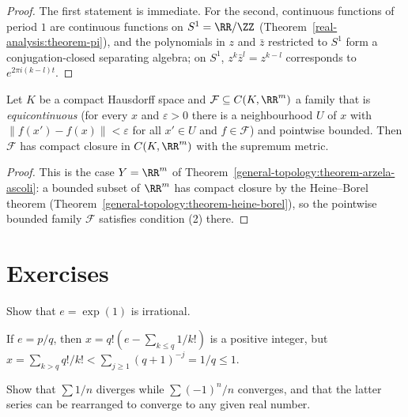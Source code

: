 \begin{proof}
The first statement is immediate. For the second, continuous functions of period $1$ are continuous functions on $S^1 = \RR/\ZZ$ (Theorem~\ref{real-analysis:theorem-pi}), and the polynomials in $z$ and $\bar z$ restricted to
$S^1$ form a conjugation-closed separating algebra; on $S^1$, $z^k\bar z^l = z^{k-l}$ corresponds to $e^{2\pi i(k-l)t}$.
\end{proof}

\begin{theorem}\label{real-analysis:theorem-arzela-ascoli}
Let $K$ be a compact Hausdorff space and $\mathcal{F} \subseteq C(K, \RR^m)$ a family that is \emph{equicontinuous} (for every $x$ and $\varepsilon > 0$ there is a neighbourhood $U$ of $x$ with
$\|f(x') - f(x)\| < \varepsilon$ for all $x' \in U$ and $f \in \mathcal{F}$) and pointwise bounded. Then $\mathcal{F}$ has compact closure in $C(K, \RR^m)$ with the supremum metric.
\end{theorem}

\begin{proof}
This is the case $Y = \RR^m$ of Theorem~\ref{general-topology:theorem-arzela-ascoli}: a bounded subset of $\RR^m$ has compact closure by the Heine--Borel theorem (Theorem~\ref{general-topology:theorem-heine-borel}), so the pointwise bounded family $\mathcal{F}$
satisfies condition (2) there.
\end{proof}

\section{Exercises}\label{real-analysis:section-exercises}

\begin{exercise}\label{real-analysis:exercise-e-irrational}
Show that $e = \exp(1)$ is irrational.
\end{exercise}

\begin{solution}
If $e = p/q$, then $x = q!(e - \sum_{k \leq q}1/k!)$ is a positive integer, but $x = \sum_{k > q}q!/k! < \sum_{j \geq 1}(q + 1)^{-j} = 1/q \leq 1$.
\end{solution}

\begin{exercise}\label{real-analysis:exercise-harmonic}
Show that $\sum 1/n$ diverges while $\sum(-1)^n/n$ converges, and that the latter series can be rearranged to converge to any given real number.
\end{exercise}

